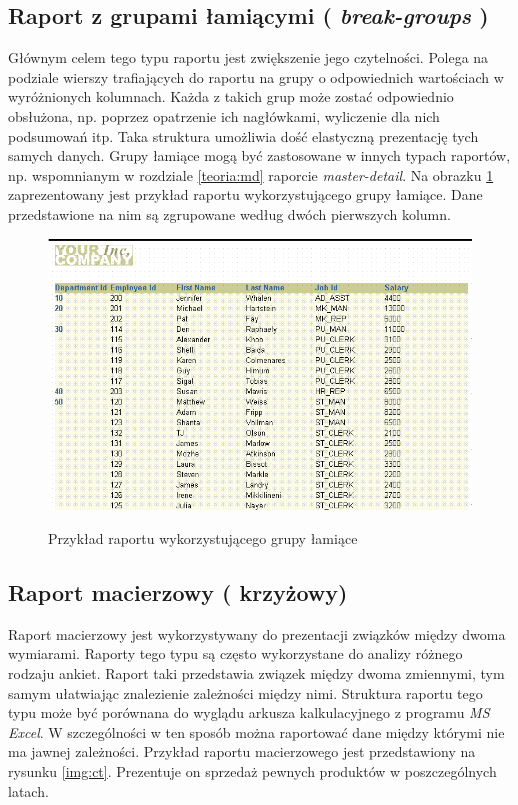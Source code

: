 \documentclass[11pt,a4paper]{article}
\begin{document}
\subsection{Raport z grupami łamiącymi ( \emph{break-groups} )} \label{teoria:bg}
Głównym celem tego typu raportu jest zwiększenie jego czytelności. Polega na podziale wierszy trafiających do raportu na grupy o odpowiednich wartościach w wyróżnionych kolumnach. Każda z takich grup może zostać odpowiednio obsłużona, np. poprzez opatrzenie ich nagłówkami, wyliczenie dla nich podsumowań itp. Taka struktura umożliwia dość elastyczną prezentację tych samych danych. Grupy łamiące mogą być zastosowane w innych typach raportów, np. wspomnianym w rozdziale \ref{teoria:md} raporcie \emph{master-detail}. Na obrazku \ref{img:bg} zaprezentowany jest przykład raportu wykorzystującego grupy łamiące. Dane przedstawione na nim są zgrupowane według dwóch pierwszych kolumn.
\begin{figure}[h]
\centering
\caption{Przykład raportu wykorzystującego grupy łamiące}
\includegraphics[scale=0.7]{grp1col_lft1_out1}
\label{img:bg}
\end{figure}

\subsection{Raport macierzowy ( krzyżowy) } \label{teoria:ct}
Raport macierzowy jest wykorzystywany do prezentacji związków między dwoma wymiarami. Raporty tego typu są często wykorzystane do analizy różnego rodzaju ankiet. Raport taki przedstawia związek między dwoma zmiennymi, tym samym ułatwiając znalezienie zależności między nimi. Struktura raportu tego typu może być porównana do wyglądu arkusza kalkulacyjnego z programu \emph{MS Excel}. W szczególności w ten sposób można raportować dane między którymi nie ma jawnej zależności. Przykład raportu macierzowego jest przedstawiony na rysunku \ref{img:ct}. Prezentuje on sprzedaż pewnych produktów w poszczególnych latach. 
\end{document}
